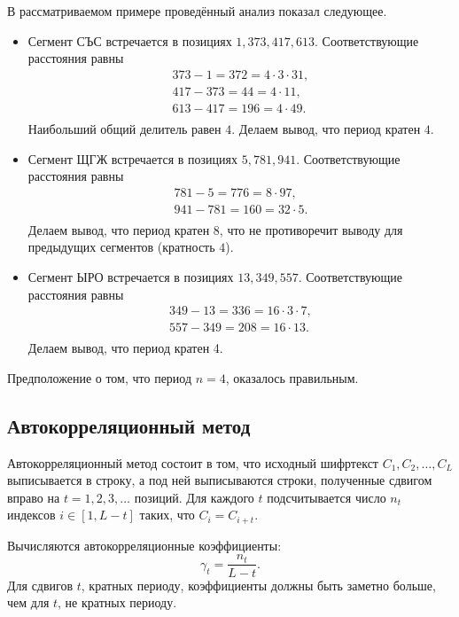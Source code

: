В рассматриваемом примере проведённый анализ показал следующее.
\begin{itemize}
    \item Сегмент СЪС встречается в позициях $1, 373, 417, 613$. Соответствующие расстояния равны
        \[ \begin{array}{l}
            373 - 1 = 372 = 4 \cdot 3 \cdot 31, \\
            417 - 373= 44 = 4 \cdot 11, \\
            613 - 417 = 196 = 4 \cdot 49. \\
        \end{array} \]
        Наибольший общий делитель равен $4$. Делаем вывод, что период кратен $4$.
    \item Сегмент ЩГЖ встречается в позициях $5, 781, 941$. Соответствующие расстояния равны
        \[ \begin{array}{l}
            781 - 5 = 776 = 8 \cdot 97, \\
            941 - 781 = 160 = 32 \cdot 5. \\
        \end{array} \]
        Делаем вывод, что период кратен $8$, что не противоречит выводу для предыдущих сегментов (кратность $4$).
    \item Сегмент ЫРО встречается в позициях $13, 349, 557$. Соответствующие расстояния равны
        \[ \begin{array}{l}
            349 - 13 = 336 = 16 \cdot 3 \cdot 7, \\
            557 - 349 = 208 = 16 \cdot 13. \\
        \end{array} \]
        Делаем вывод, что период кратен 4.
\end{itemize}

Предположение о том, что период $n=4$, оказалось правильным.
\exampleend


\subsection{Автокорреляционный метод}

Автокорреляционный метод состоит в том, что исходный шифртекст $C_{1},C_{2}, \ldots, C_{L}$ выписывается в строку, а под ней выписываются строки, полученные сдвигом вправо на $t =1, 2, 3, \ldots$ позиций. Для каждого $t$ подсчитывается число $n_{t}$ индексов $i \in \left[ {1,L - t} \right]$ таких, что $C_i  = C_{i + t}$.

Вычисляются автокорреляционные коэффициенты:
    \[ \gamma_t  = \frac{n_t}{L - t}. \]
Для сдвигов $t$, кратных периоду, коэффициенты должны быть заметно больше, чем для $t$, не кратных периоду.

